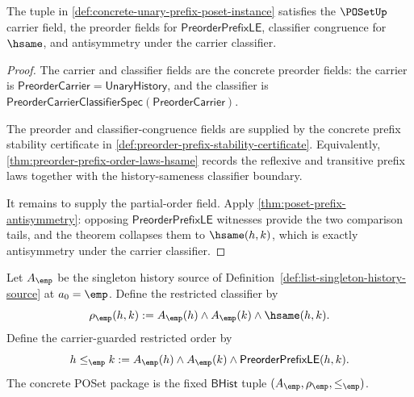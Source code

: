 \begin{theorem}
\label{thm:concrete-unary-prefix-poset-laws}
The tuple in \autoref{def:concrete-unary-prefix-poset-instance} satisfies the $\POSetUp$ carrier field, the preorder fields for $\mathsf{PreorderPrefixLE}$, classifier congruence for $\hsame$, and antisymmetry under the carrier classifier.
\end{theorem}
\begin{proof}
The carrier and classifier fields are the concrete preorder fields: the carrier is $\mathsf{PreorderCarrier}=\mathsf{UnaryHistory}$, and the classifier is $\mathsf{PreorderCarrierClassifierSpec}(\mathsf{PreorderCarrier})$.

The preorder and classifier-congruence fields are supplied by the concrete prefix stability certificate in \autoref{def:preorder-prefix-stability-certificate}. Equivalently, \autoref{thm:preorder-prefix-order-laws-hsame} records the reflexive and transitive prefix laws together with the history-sameness classifier boundary.

It remains to supply the partial-order field. Apply \autoref{thm:poset-prefix-antisymmetry}: opposing $\mathsf{PreorderPrefixLE}$ witnesses provide the two comparison tails, and the theorem collapses them to $\hsame(h,k)$, which is exactly antisymmetry under the carrier classifier.
\end{proof}

\begin{definition}
\label{def:concrete-singleton-empty-poset-instance}
Let $A_{\emp}$ be the singleton history source of
Definition~\ref{def:list-singleton-history-source} at $a_0=\emp$. Define the
restricted classifier by
$$
\rho_{\emp}(h,k):=
A_{\emp}(h)\land A_{\emp}(k)\land\hsame(h,k).
$$
Define the carrier-guarded restricted order by
$$
h\le_{\emp}k:=
A_{\emp}(h)\land A_{\emp}(k)\land \mathsf{PreorderPrefixLE}(h,k).
$$
The concrete POSet package is the fixed $\mathsf{BHist}$ tuple
$(A_{\emp},\rho_{\emp},\le_{\emp})$.
\end{definition}

